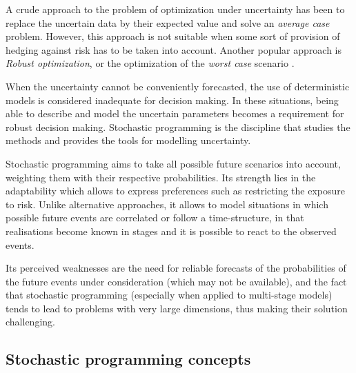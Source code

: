 A crude approach to the problem of optimization under uncertainty
has been to replace the uncertain data by their expected value and
solve an {\em average case} problem. However, this approach is not
suitable when some sort of provision of hedging against risk has to be
taken into account. Another popular approach is {\em Robust
optimization}, or the optimization of the {\em worst case}
scenario \cite{KallWallace}. 

When the uncertainty cannot be conveniently forecasted, the use of 
deterministic models is considered inadequate for decision making. In 
these situations, being able to describe and model the uncertain parameters
becomes a requirement for robust decision making. Stochastic 
programming \cite{BirgeLouveaux,KallWallace} is the discipline that 
studies the methods and provides the tools for modelling uncertainty.

Stochastic programming aims to take all possible future scenarios 
into account, weighting them
with their respective probabilities. Its strength lies in the
adaptability which allows to express preferences such as restricting
the exposure to risk. Unlike alternative approaches, it allows to model
situations in which possible future events are correlated or follow a
time-structure, in that realisations become known in stages and it is
possible to react to the observed events.


Its perceived weaknesses are the need for reliable forecasts
of the probabilities of the future events under consideration
(which may not be available), and the fact that stochastic programming
(especially when applied to multi-stage models) tends to lead to
problems with very large dimensions, thus making their solution
challenging. 

%
%
\subsection{Stochastic programming concepts}

